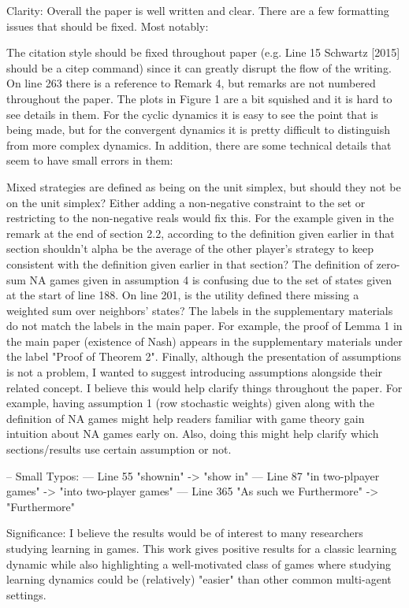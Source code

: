 \documentclass{article}
\begin{document}
	Clarity: Overall the paper is well written and clear. There are a few formatting issues that should be fixed. Most notably:
	
	The citation style should be fixed throughout paper (e.g. Line 15 Schwartz [2015] should be a citep command) since it can greatly disrupt the flow of the writing.
	On line 263 there is a reference to Remark 4, but remarks are not numbered throughout the paper.
	The plots in Figure 1 are a bit squished and it is hard to see details in them. For the cyclic dynamics it is easy to see the point that is being made, but for the convergent dynamics it is pretty difficult to distinguish from more complex dynamics.
	In addition, there are some technical details that seem to have small errors in them:
	
	Mixed strategies are defined as being on the unit simplex, but should they not be on the unit simplex? Either adding a non-negative constraint to the set or restricting to the non-negative reals would fix this.
	For the example given in the remark at the end of section 2.2, according to the definition given earlier in that section shouldn't alpha be the average of the other player's strategy to keep consistent with the definition given earlier in that section?
	The definition of zero-sum NA games given in assumption 4 is confusing due to the set of states given at the start of line 188.
	On line 201, is the utility defined there missing a weighted sum over neighbors' states?
	The labels in the supplementary materials do not match the labels in the main paper. For example, the proof of Lemma 1 in the main paper (existence of Nash) appears in the supplementary materials under the label "Proof of Theorem 2".
	Finally, although the presentation of assumptions is not a problem, I wanted to suggest introducing assumptions alongside their related concept. I believe this would help clarify things throughout the paper. For example, having assumption 1 (row stochastic weights) given along with the definition of NA games might help readers familiar with game theory gain intuition about NA games early on. Also, doing this might help clarify which sections/results use certain assumption or not.
	
	-- Small Typos: --- Line 55 "shownin" -> "show in" --- Line 87 "in two-plpayer games" -> "into two-player games" --- Line 365 "As such we Furthermore" -> "Furthermore"
	
	Significance: I believe the results would be of interest to many researchers studying learning in games. This work gives positive results for a classic learning dynamic while also highlighting a well-motivated class of games where studying learning dynamics could be (relatively) "easier" than other common multi-agent settings.
	
\end{document}
